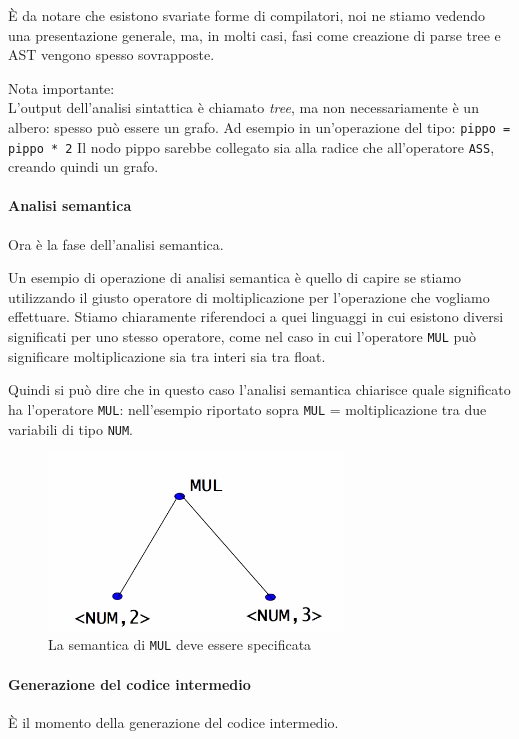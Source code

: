 \documentclass[class=book, crop=false, oneside]{standalone}
\begin{document}
È da notare che esistono svariate forme di compilatori, noi ne stiamo vedendo una presentazione generale, ma, in molti casi, fasi come creazione di parse tree e AST vengono spesso sovrapposte.

Nota importante:\\
L’output dell’analisi sintattica è chiamato \emph{tree}, ma non necessariamente è un albero: spesso può essere un grafo. Ad esempio in un’operazione del tipo:
\texttt{pippo = pippo * 2}
Il nodo pippo sarebbe collegato sia alla radice che all’operatore \texttt{ASS}, creando quindi un grafo.

\paragraph{Analisi semantica}
Ora è la fase dell’analisi semantica.

Un esempio di operazione di analisi semantica è quello di capire se stiamo utilizzando il giusto operatore di moltiplicazione per l’operazione che vogliamo effettuare. Stiamo chiaramente riferendoci a quei linguaggi in cui esistono diversi significati per uno stesso operatore, come nel caso in cui l'operatore \texttt{MUL} può significare moltiplicazione sia tra interi sia tra float.

Quindi si può dire che in questo caso l’analisi semantica chiarisce quale significato ha l’operatore \texttt{MUL}: nell’esempio riportato sopra \texttt{MUL} = moltiplicazione tra due variabili di tipo \texttt{NUM}.
\begin{figure}[H]
	\centering
	\includegraphics[width=0.7\textwidth,keepaspectratio]{semantic_analysis}
	\caption{La semantica di \texttt{MUL} deve essere specificata}
\end{figure}

\paragraph{Generazione del codice intermedio}
È il momento della generazione del codice intermedio.
\end{document}
